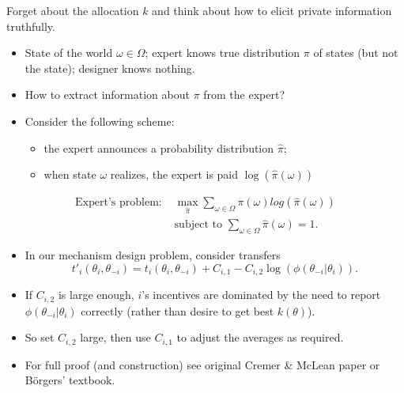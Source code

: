 \documentclass[english,handout,10pt]{beamer}		%
\def\lyxframeend{} %
\begin{document}
Forget about the allocation \(k\) and think about how to elicit private information truthfully.
\begin{example}
	\begin{itemize}
		\item State of the world $\omega \in \Omega$; expert knows true distribution $\pi$ of states (but not the state); designer knows nothing.
		\item How to extract information about $\pi$ from the expert?
		\item Consider the following scheme:
		\begin{itemize}
			\item the expert announces a probability distribution $\hat{\pi}$;
			\item when state $\omega$ realizes, the expert is paid $\log(\hat{\pi}(\omega))$
		\end{itemize}
	\end{itemize}
{\footnotesize
\begin{align*}
\text{Expert's problem: } & \max_{\hat{\pi}}\sum_{\omega\in\Omega} \pi(\omega) log(\hat{\pi}(\omega))
\\
&\text{subject to } \sum_{\omega\in\Omega} \hat{\pi}(\omega)=1.
\end{align*}
\vspace{-1ex}
}
\end{example}
\lyxframeend


\begin{itemize}
	\item In our mechanism design problem, consider transfers
	$$t'_i(\theta_i,\theta_{-i}) = t_i(\theta_i,\theta_{-i}) + C_{i,1} - C_{i,2} \log (\phi(\theta_{-i}|\theta_i)).$$
	\item If $C_{i,2}$ is large enough, $i$'s incentives are dominated by the need to report $\phi(\theta_{-i}|\theta_i)$ correctly (rather than desire to get best $k(\theta)$).
	\item So set $C_{i,2}$ large, then use $C_{i,1}$ to adjust the averages as required.
	\item For full proof (and construction) see original Cremer \& McLean paper or B{\"o}rgers' textbook.
\end{itemize}
\lyxframeend
\end{document}
